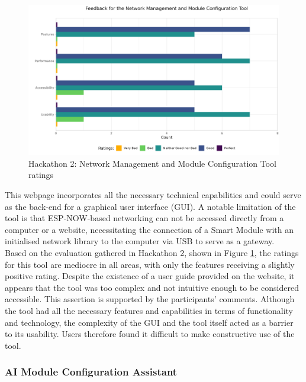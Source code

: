 \begin{figure}[H]
    \centering
    \vspace{\ftspace}
    \includegraphics[width=\linewidth]{rstudio/survey/plots/nmmct.png}
    \vspace{.06\ftspace}
    \caption{Hackathon 2: Network Management and Module Configuration Tool ratings}
    \label{fig:nmmct_q}
\end{figure}

\newpage

This webpage incorporates all the necessary technical capabilities and could serve as the back-end for a graphical user interface (GUI). A notable limitation of the tool is that ESP-NOW-based networking can not be accessed directly from a computer or a website, necessitating the connection of a Smart Module with an initialised network library to the computer via USB to serve as a gateway. \\

Based on the evaluation gathered in Hackathon 2, shown in Figure \ref{fig:nmmct_q}, the ratings for this tool are mediocre in all areas, with only the features receiving a slightly positive rating. Despite the existence of a user guide provided on the website, it appears that the tool was too complex and not intuitive enough to be considered accessible. This assertion is supported by the participants' comments. Although the tool had all the necessary features and capabilities in terms of functionality and technology, the complexity of the GUI and the tool itself acted as a barrier to its usability. Users therefore found it difficult to make constructive use of the tool.

\subsubsection{\label{sec:res_ai_config}AI Module Configuration Assistant}

